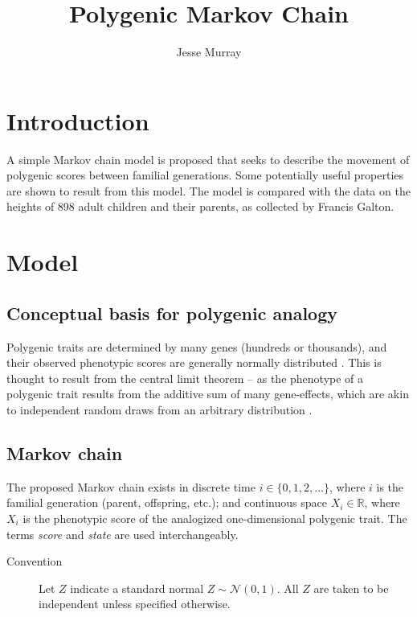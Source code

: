 \documentclass[a4paper,11pt]{article}
\title{Polygenic Markov Chain}
\author{Jesse Murray}
\begin{document}
\maketitle
\thispagestyle{empty}
\newpage
{}

\section{Introduction}
A simple Markov chain model is proposed that seeks to describe the movement of polygenic scores between familial generations. Some potentially useful properties are shown to result from this model. The model is compared with the data on the heights of 898 adult children and their parents, as collected by Francis Galton. 


\section{Model}

\subsection{Conceptual basis for polygenic analogy}

Polygenic traits are determined by many genes (hundreds or thousands), and their observed phenotypic scores are generally normally distributed \cite{lange_article, lange_book}. This is thought to result from the central limit theorem -- as the phenotype of a polygenic trait results from the additive sum of many gene-effects, which are akin to independent random draws from an arbitrary distribution \cite{rieger}.


\subsection{Markov chain}
The proposed Markov chain exists in discrete time $ i \in \{0, 1, 2,...\}$, where $i$ is the familial generation (parent, offspring, etc.); and continuous space $X_i \in \mathbb{R}$, where $X_i$ is the phenotypic score of the analogized one-dimensional polygenic trait. The terms \emph{score} and \emph{state} are used interchangeably. 

\begin{description}
\item [Convention] Let $Z$ indicate a standard normal $Z \sim \mathcal{N}(0, 1)$. All $Z$ are taken to be independent unless specified otherwise.
\end{description}
\end{document}

